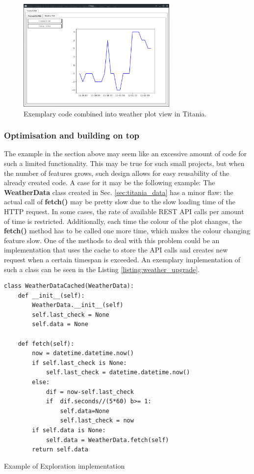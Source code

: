 \begin{figure}[h]
\centering
\includegraphics[width=0.7\textwidth]{figures/chapter5/titania/titania_weather_screen.png}
\caption{Exemplary code combined into weather plot view in Titania.}
\label{fig:titania-weather}
\end{figure}

\subsubsection{Optimisation and building on top}

The example in the section above may seem like an excessive amount of code for such a limited functionality.
This may be true for such small projects, but when the number of features grows, such design allows for easy reusability of the already created code.
A case for it may be the following example:
The \textbf{WeatherData} class created in Sec. \ref{sec:titania_data} has a minor flaw: the actual call of \textbf{fetch()} may be pretty slow due to the slow loading time of the HTTP request.
In some cases, the rate of available REST API calls per amount of time is restricted.
Additionally, each time the colour of the plot changes, the \textbf{fetch()} method has to be called one more time, which makes the colour changing feature slow.
One of the methods to deal with this problem could be an implementation that uses the cache to store the API calls and creates new request when a certain timespan is exceeded.
An exemplary implementation of such a class can be seen in the Listing \ref{listing:weather_upgrade}.


\begin{listing}[!ht]
\begin{verbatim}
class WeatherDataCached(WeatherData):
    def __init__(self):
        WeatherData.__init__(self)
        self.last_check = None
        self.data = None

    def fetch(self):
        now = datetime.datetime.now()
        if self.last_check is None:
            self.last_check = datetime.datetime.now()
        else:
            dif = now-self.last_check
            if  dif.seconds//(5*60) b>= 1:
                self.data=None
                self.last_check = now
        if self.data is None:
            self.data = WeatherData.fetch(self)
        return self.data
\end{verbatim}
\caption{Example of Exploration implementation}
\label{listing:weather_upgrade}
\end{listing}


